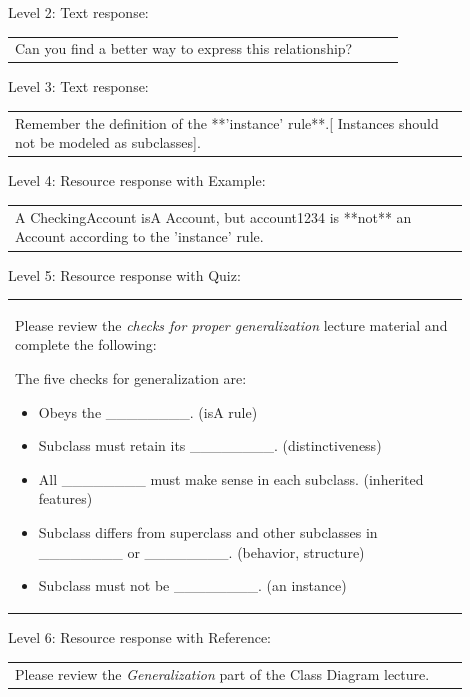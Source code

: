 \noindent Level 2: Text response: \medskip

\begin{tabular}{|p{0.9\linewidth}}
Can you find a better way to express this relationship?
\end{tabular} \medskip

\noindent Level 3: Text response: \medskip

\begin{tabular}{|p{0.9\linewidth}}
Remember the definition of the **'instance' rule**.[ Instances should not be modeled as subclasses].
\end{tabular} \medskip

\noindent Level 4: Resource response with Example: \medskip

\begin{tabular}{|p{0.9\linewidth}}
A CheckingAccount isA Account, but account1234 is **not** an Account according to the 'instance' rule.
\end{tabular} \medskip

\noindent Level 5: Resource response with Quiz: \medskip

\begin{tabular}{|p{0.9\linewidth}}
Please review the \textit{checks for proper generalization} lecture material
and complete the following:

The five checks for generalization are:
\begin{itemize}
    \item Obeys the \_\_\_\_\_\_\_\_. (isA rule)
    \item Subclass must retain its \_\_\_\_\_\_\_\_. (distinctiveness)
    \item All \_\_\_\_\_\_\_\_ must make sense in each subclass. (inherited features)
    \item Subclass differs from superclass and other subclasses in \_\_\_\_\_\_\_\_ or \_\_\_\_\_\_\_\_. (behavior, structure)
    \item Subclass must not be \_\_\_\_\_\_\_\_. (an instance)
\end{itemize}

\end{tabular} \medskip

\noindent Level 6: Resource response with Reference: \medskip

\begin{tabular}{|p{0.9\linewidth}}
Please review the \textit{Generalization} part of the Class Diagram lecture.
\end{tabular} \medskip


